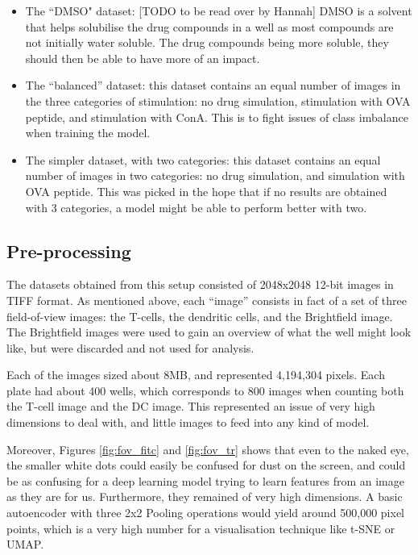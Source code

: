 \begin{itemize}
    \item The ``DMSO" dataset: [TODO to be read over by Hannah] DMSO is a solvent that helps solubilise the drug compounds in a well as most compounds are not initially water soluble. The drug compounds being more soluble, they should then be able to have more of an impact.
    \item The ``balanced” dataset: this dataset contains an equal number of images in the three categories of stimulation: no drug simulation, stimulation with OVA peptide, and stimulation with ConA. This is to fight issues of class imbalance when training the model.
    \item The simpler dataset, with two categories: this  dataset contains an equal number of images in two categories: no drug simulation, and simulation with OVA peptide. This was picked in the hope that if no results are obtained with 3 categories, a model might be able to perform better with two.
\end{itemize}

\subsection{Pre-processing}
The datasets obtained from this setup consisted of 2048x2048 12-bit images in TIFF format. As mentioned above, each ``image” consists in fact of a set of three field-of-view images: the T-cells, the dendritic cells, and the Brightfield image. The Brightfield images were used to gain an overview of what the well might look like, but were discarded and not used for analysis.

Each of the images sized about 8MB, and represented 4,194,304 pixels. Each plate had about 400 wells, which corresponds to 800 images when counting both the T-cell image and the DC image. This represented an issue of very high dimensions to deal with, and little images to feed into any kind of model.

Moreover, Figures \ref{fig:fov_fitc} and \ref{fig:fov_tr} shows that even to the naked eye, the smaller white dots could easily be confused for dust on the screen, and could be as confusing for a deep learning model trying to learn features from an image as they are for us. Furthermore, they remained of very high dimensions. A basic autoencoder with three 2x2 Pooling operations would yield around 500,000 pixel points, which is a very high number for a visualisation technique like t-SNE or UMAP.


